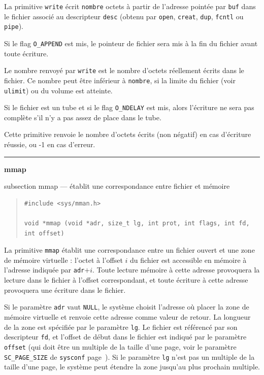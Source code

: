 \documentclass [twoside] {report}
\newcommand {\primitive} [1]
    {
	\phantomsection
	{\large \textbf {#1}}
	\addcontentsline {toc} {subsection} {#1}
    }
\newcommand {\separation}
    {
	\vspace {5mm}
	\nopagebreak
	\hrule
    }
\begin{document}
La primitive \texttt {write} écrit \texttt {nombre} octets à
partir de l'adresse pointée par \texttt {buf} dans le
fichier associé au descripteur \texttt {desc} (obtenu par
\texttt {open}, \texttt {creat}, \texttt {dup}, \texttt {fcntl} ou \texttt {pipe}).

Si le flag \texttt {O\_APPEND} est mis, le pointeur de
fichier sera mis à la fin du fichier avant toute
écriture.

Le nombre renvoyé par \texttt {write} est le nombre
d'octets réellement écrits dans le fichier. Ce
nombre peut être inférieur à \texttt {nombre}, si la
limite du fichier (voir \texttt {ulimit}) ou du volume
est atteinte.

Si le fichier est un tube et si le flag
\texttt {O\_NDELAY} est mis, alors l'écriture ne sera pas
complète s'il n'y a pas assez de place dans le
tube.

Cette primitive renvoie le nombre d'octets écrits
(non négatif) en cas d'écriture
réussie, ou -1 en cas d'erreur.


\separation
\primitive {mmap} --- établit une correspondance entre fichier et mémoire
    \label {mmap}

\begin {quote}
\begin {verbatim}
#include <sys/mman.h>

void *mmap (void *adr, size_t lg, int prot, int flags, int fd, int offset)
\end{verbatim}
\end {quote}

La primitive \texttt {mmap} établit une correspondance entre un fichier
ouvert et une zone de mémoire virtuelle : l'octet à l'offset $i$ du
fichier est accessible en mémoire à l'adresse indiquée par \texttt
{adr}$+i$. Toute lecture mémoire à cette adresse provoquera la lecture
dans le fichier à l'offset correspondant, et toute écriture à cette
adresse provoquera une écriture dans le fichier.

Si le paramètre \texttt {adr} vaut \texttt {NULL}, le système choisit
l'adresse où placer la zone de mémoire virtuelle et renvoie cette
adresse comme valeur de retour. La longueur de la zone est spécifiée
par le paramètre \texttt {lg}. Le fichier est référencé par son
descripteur \texttt {fd}, et l'offset de début dans le fichier est
indiqué par le paramètre \texttt {offset} (qui doit être un multiple
de la taille d'une page, voir le paramètre \texttt {SC\_PAGE\_SIZE}
de \texttt {sysconf} page~\pageref {sysconf}). Si le paramètre \texttt {lg}
n'est pas un multiple de la taille d'une page, le système peut étendre
la zone jusqu'au plus prochain multiple.
\end{document}
